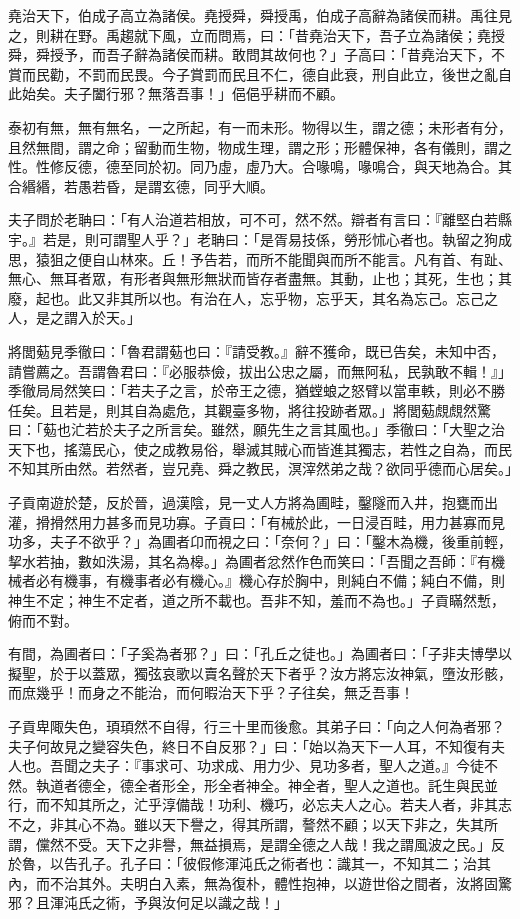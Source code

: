 \begin{pinyinscope}
堯治天下，伯成子高立為諸侯。堯授舜，舜授禹，伯成子高辭為諸侯而耕。禹往見之，則耕在野。禹趨就下風，立而問焉，曰：「昔堯治天下，吾子立為諸侯；堯授舜，舜授予，而吾子辭為諸侯而耕。敢問其故何也？」子高曰：「昔堯治天下，不賞而民勸，不罰而民畏。今子賞罰而民且不仁，德自此衰，刑自此立，後世之亂自此始矣。夫子闔行邪？無落吾事！」俋俋乎耕而不顧。

泰初有無，無有無名，一之所起，有一而未形。物得以生，謂之德；未形者有分，且然無間，謂之命；留動而生物，物成生理，謂之形；形體保神，各有儀則，謂之性。性修反德，德至同於初。同乃虛，虛乃大。合喙鳴，喙鳴合，與天地為合。其合緡緡，若愚若昏，是謂玄德，同乎大順。

夫子問於老聃曰：「有人治道若相放，可不可，然不然。辯者有言曰：『離堅白若縣宇。』若是，則可謂聖人乎？」老聃曰：「是胥易技係，勞形怵心者也。執留之狗成思，猿狙之便自山林來。丘！予告若，而所不能聞與而所不能言。凡有首、有趾、無心、無耳者眾，有形者與無形無狀而皆存者盡無。其動，止也；其死，生也；其廢，起也。此又非其所以也。有治在人，忘乎物，忘乎天，其名為忘己。忘己之人，是之謂入於天。」

將閭葂見季徹曰：「魯君謂葂也曰：『請受教。』辭不獲命，既已告矣，未知中否，請嘗薦之。吾謂魯君曰：『必服恭儉，拔出公忠之屬，而無阿私，民孰敢不輯！』」季徹局局然笑曰：「若夫子之言，於帝王之德，猶螳蜋之怒臂以當車軼，則必不勝任矣。且若是，則其自為處危，其觀臺多物，將往投跡者眾。」將閭葂覤覤然驚曰：「葂也汒若於夫子之所言矣。雖然，願先生之言其風也。」季徹曰：「大聖之治天下也，搖蕩民心，使之成教易俗，舉滅其賊心而皆進其獨志，若性之自為，而民不知其所由然。若然者，豈兄堯、舜之教民，溟滓然弟之哉？欲同乎德而心居矣。」

子貢南遊於楚，反於晉，過漢陰，見一丈人方將為圃畦，鑿隧而入井，抱甕而出灌，搰搰然用力甚多而見功寡。子貢曰：「有械於此，一日浸百畦，用力甚寡而見功多，夫子不欲乎？」為圃者卬而視之曰：「奈何？」曰：「鑿木為機，後重前輕，挈水若抽，數如泆湯，其名為槔。」為圃者忿然作色而笑曰：「吾聞之吾師：『有機械者必有機事，有機事者必有機心。』機心存於胸中，則純白不備；純白不備，則神生不定；神生不定者，道之所不載也。吾非不知，羞而不為也。」子貢瞞然慙，俯而不對。

有間，為圃者曰：「子奚為者邪？」曰：「孔丘之徒也。」為圃者曰：「子非夫博學以擬聖，於于以蓋眾，獨弦哀歌以賣名聲於天下者乎？汝方將忘汝神氣，墮汝形骸，而庶幾乎！而身之不能治，而何暇治天下乎？子往矣，無乏吾事！

子貢卑陬失色，頊頊然不自得，行三十里而後愈。其弟子曰：「向之人何為者邪？夫子何故見之變容失色，終日不自反邪？」曰：「始以為天下一人耳，不知復有夫人也。吾聞之夫子：『事求可、功求成、用力少、見功多者，聖人之道。』今徒不然。執道者德全，德全者形全，形全者神全。神全者，聖人之道也。託生與民並行，而不知其所之，汒乎淳備哉！功利、機巧，必忘夫人之心。若夫人者，非其志不之，非其心不為。雖以天下譽之，得其所謂，謷然不顧；以天下非之，失其所謂，儻然不受。天下之非譽，無益損焉，是謂全德之人哉！我之謂風波之民。」反於魯，以告孔子。孔子曰：「彼假修渾沌氏之術者也：識其一，不知其二；治其內，而不治其外。夫明白入素，無為復朴，體性抱神，以遊世俗之間者，汝將固驚邪？且渾沌氏之術，予與汝何足以識之哉！」


\end{pinyinscope}
